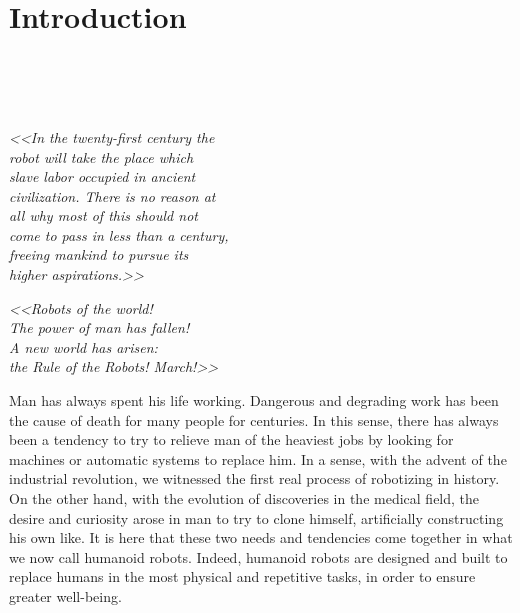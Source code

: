 \section{Introduction}
\\
\\
\\
\begin{center}
    \textit{<<In the twenty-first century the \\
    robot will take the place which \\
    slave labor occupied in ancient \\ 
    civilization. There is no reason at \\ 
    all why most of this should not \\
    come to pass in less than a century, \\
    freeing mankind to pursue its \\
    higher aspirations.>>} \\ 
\end{center}


\begin{center}
    \textit{<<Robots of the world! \\
    The power of
man has fallen!\\ A new world has
arisen:\\ the Rule of the Robots!
March!>>}\\
\end{center}

Man has always spent his life working. Dangerous and degrading work has been the cause of death for many people for centuries. 
In this sense, there has always been a tendency to try to relieve man of the heaviest jobs by looking for machines or automatic systems to replace him.
In a sense, with the advent of the industrial revolution, we witnessed the first real process of robotizing in history.
On the other hand, with the evolution of discoveries in the medical field, the desire and curiosity arose in man to try to clone himself, artificially constructing his own like.
It is here that these two needs and tendencies come together in what we now call humanoid robots.
Indeed, humanoid robots are designed and built to replace humans in the most physical and repetitive tasks, in order to ensure greater well-being.

\newpage

